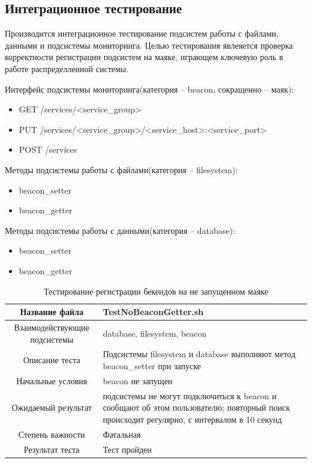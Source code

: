 \documentclass[a4paper,12pt]{report}
\numberwithin{equation}{section}
\begin{document}
\subsection{Интеграционное тестирование}
Производится интеграционное тестирование подсистем работы с файлами, данными и подсистемы мониторинга. Целью тестирования явлеяется проверка
корректности регистрации подсистем на маяке, играющем ключевую роль в работе распределленной системы.

Интерфейс подсистемы мониторинга(категория -- beacon, сокращенно -- маяк):
\begin{itemize}
  \item GET /services/<service\_group>
  \item PUT /services/<service\_group>/<service\_host>:<service\_port>
  \item POST /services
\end{itemize}

Методы подсистемы работы с файлами(категория -- filesystem):
\begin{itemize}
  \item beacon\_setter
  \item beacon\_getter
\end{itemize}

Методы подсистемы работы с данными(категория -- database):
\begin{itemize}
  \item beacon\_setter
  \item beacon\_getter
\end{itemize}

\begin{table}[h]
\caption{Тестирование регистрации бекендов на не запущенном маяке}
\begin{tabu} to \textwidth {|c|X|}
\hline
Название файла & TestNoBeaconGetter.sh \\ \hline
Взаимодействующие подсистемы & database, filesystem, beacon \\ \hline
Описание теста & Подсистемы filesystem и database выполняют метод beacon\_setter при запуске \\ \hline
Начальные условия & beacon не запущен \\
Ожидаемый результат & подсистемы не могут подключиться к beacon и сообщают об этом пользователю; повторный поиск происходит регулярно, с интервалом в 10 секунд \\ \hline
Степень важности & Фатальная \\ \hline
Результат теста & Тест пройден \\ \hline
\end{tabu}
\end{table}
\end{document}
